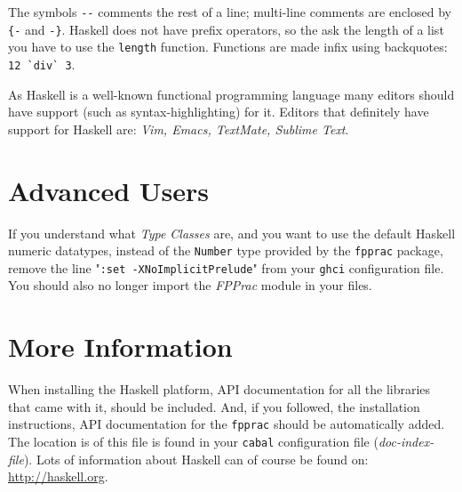\documentclass[]{article}
\begin{document}
The symbols \verb!--! comments the rest of a line; multi-line comments are enclosed by \verb!{-! and \verb!-}!. Haskell does not have prefix operators, so the ask the length of a list you have to use the \verb!length! function. Functions are made infix using backquotes: \verb!12 `div` 3!.

As Haskell is a well-known functional programming language many editors should have support (such as syntax-highlighting) for it. Editors that definitely have support for Haskell are: \emph{Vim, Emacs, TextMate, Sublime Text}. 

\section{Advanced Users}
If you understand what \emph{Type Classes} are, and you want to use the default Haskell numeric datatypes, instead of the \verb!Number! type provided by the \verb!fpprac! package, remove the line "\verb!:set -XNoImplicitPrelude!" from your \verb!ghci! configuration file. You should also no longer import the \emph{FPPrac} module in your files. 

\section{More Information}
When installing the Haskell platform, API documentation for all the libraries that came with it, should be included. And, if you followed, the installation instructions, API documentation for the \verb!fpprac! should be automatically added. The location is of this file is found in your \verb!cabal! configuration file (\emph{doc-index-file}). Lots of information about Haskell can of course be found on: \url{http://haskell.org}.
\end{document}
